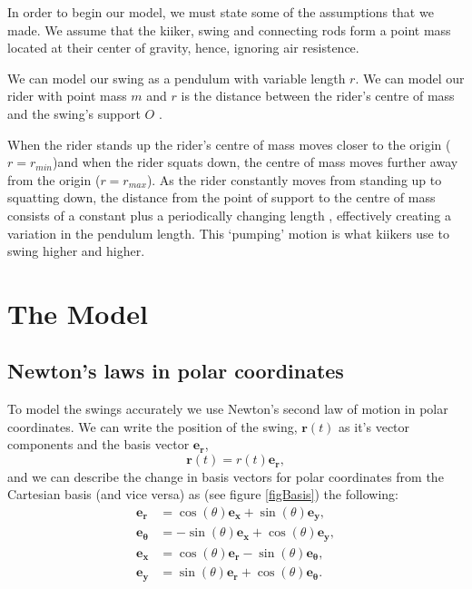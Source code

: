 \documentclass[12pt]{article}
\begin{document}

In order to begin our model, we must state some of the assumptions that we made.  We assume that the kiiker, swing and connecting rods form a point mass located at their center of gravity, hence, ignoring air resistence.

We can model our swing as a pendulum with variable length $r$.  We can model our rider with point mass $m$ and $r$ is the distance between the rider's centre of mass and the swing's support $O$ \cite{wirkus1998pump}.  

When the rider stands up the rider's centre of mass moves closer to the origin ($r = r_{min}$)and when the rider squats down, the centre of mass moves further away from the origin ($r = r_{max}$). As the rider constantly moves from standing up to squatting down, the distance from the point of support to the centre of mass consists of a constant plus a periodically changing length \cite{William1996standing}, effectively creating a variation in the pendulum length. This `pumping' motion is what kiikers use to swing higher and higher. 

\section{The Model}
\subsection{Newton's laws in polar coordinates}

To model the swings accurately we use Newton's second law %
of motion in polar coordinates. We can write the position of the swing, $\mathbf{r} (t)$ 
as it's vector components and the basis vector $\mathbf{e_r}$,
$$\mathbf{r}(t) = r(t)\mathbf{e_r},$$
and we can describe the change in basis vectors for polar coordinates from the Cartesian basis (and vice versa) as (see figure \ref{figBasis}) the following:
\begin{align}
    \mathbf{e_r} &= \cos(\theta) \mathbf{e_x} + \sin(\theta) \mathbf{e_y}, \\
    \mathbf{e_\theta} &= -\sin(\theta) \mathbf{e_x} + \cos(\theta) \mathbf{e_y},\\
    \mathbf{e_x} &= \cos(\theta)\mathbf{e_r} - \sin(\theta) \mathbf{e_\theta},\\
    \mathbf{e_y} &= \sin(\theta) \mathbf{e_r} + \cos(\theta) \mathbf{e_\theta}.
\end{align}
\end{document}
